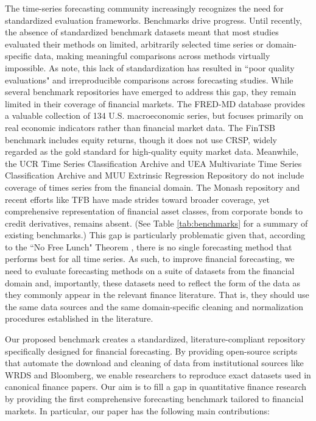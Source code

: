 \documentclass{article}
\begin{document}
The time-series forecasting community increasingly recognizes the need for standardized evaluation frameworks. 
Benchmarks drive progress.
Until recently, the absence of standardized benchmark datasets meant that most studies evaluated their methods on limited, arbitrarily selected time series or domain-specific data, making meaningful comparisons across methods virtually impossible. As \citet{Prater2024} note, this lack of standardization has resulted in ``poor quality evaluations" and irreproducible comparisons across forecasting studies. While several benchmark repositories have emerged to address this gap, they remain limited in their coverage of financial markets. 
The FRED-MD database \citep{McCracken2016} provides a valuable collection of 134 U.S. macroeconomic series, but focuses primarily on real economic indicators rather than financial market data. The FinTSB benchmark \citep{Hu2018} includes equity returns, though it does not use CRSP, widely regarded as the gold standard for high-quality equity market data. Meanwhile, the UCR Time Series Classification Archive \citep{Dau2019} and UEA Multivariate Time Series Classification Archive \citep{Bagnall2018} and MUU Extrinsic Regression Repository \citep{Tan2020} do not include coverage of times series from the financial domain.
The Monash repository \citep{Godahewa2021} and recent efforts like TFB \citep{Qiu2024} have made strides toward broader coverage, yet comprehensive representation of financial asset classes, from corporate bonds to credit derivatives, remains absent. (See Table \ref{tab:benchmarks} for a summary of existing benchmarks.) This gap is particularly problematic given that, according to the ``No Free Lunch" Theorem \citep{Wolpert1997},
there is no single forecasting method that performs best for all time series. As such, to improve financial forecasting, we need to evaluate forecasting methods on a suite of datasets from the financial domain and, importantly,
these datasets need to reflect the form of the data as they commonly appear in the relevant finance literature. That is, they should use the same data sources and the same domain-specific cleaning and normalization procedures established in the literature. 


Our proposed benchmark creates a standardized, literature-compliant repository specifically designed for financial forecasting. By providing open-source scripts that automate the download and cleaning of data from institutional sources like WRDS and Bloomberg, we enable researchers to reproduce exact datasets used in canonical finance papers. Our aim is to fill a gap in quantitative finance research by providing the first comprehensive forecasting benchmark tailored to financial markets. In particular, our paper has the following main contributions:
\end{document}
